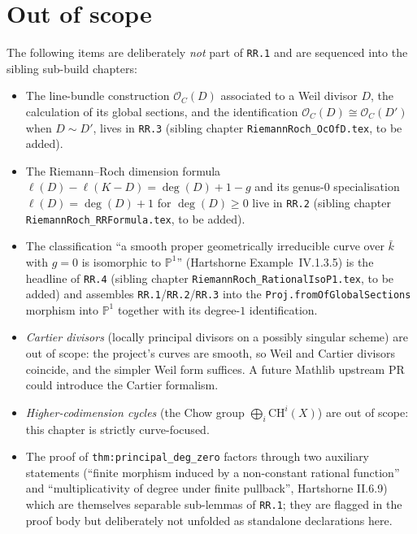 \section{Out of scope}
The following items are deliberately \emph{not} part of \texttt{RR.1} and
are sequenced into the sibling sub-build chapters:
\begin{itemize}
  \item The line-bundle construction \(\mathcal O_C(D)\) associated to a Weil
    divisor \(D\), the calculation of its global sections, and the
    identification \(\mathcal O_C(D) \cong \mathcal O_C(D')\) when
    \(D \sim D'\), lives in \texttt{RR.3} (sibling chapter
    \texttt{RiemannRoch\_OcOfD.tex}, to be added).
  \item The Riemann--Roch dimension formula
    \(\ell(D) - \ell(K - D) = \deg(D) + 1 - g\) and its genus-\(0\) specialisation
    \(\ell(D) = \deg(D) + 1\) for \(\deg(D) \geq 0\) live in \texttt{RR.2}
    (sibling chapter \texttt{RiemannRoch\_RRFormula.tex}, to be added).
  \item The classification ``a smooth proper geometrically irreducible
    curve over \(\bar k\) with \(g = 0\) is isomorphic to \(\mathbb P^1\)''
    (Hartshorne Example~IV.1.3.5) is the headline of \texttt{RR.4}
    (sibling chapter \texttt{RiemannRoch\_RationalIsoP1.tex}, to be added)
    and assembles \texttt{RR.1}/\texttt{RR.2}/\texttt{RR.3} into the
    \texttt{Proj.fromOfGlobalSections} morphism into \(\mathbb P^1\) together
    with its degree-\(1\) identification.
  \item \emph{Cartier divisors} (locally principal divisors on a possibly
    singular scheme) are out of scope: the project's curves are smooth, so
    Weil and Cartier divisors coincide, and the simpler Weil form suffices.
    A future Mathlib upstream PR could introduce the Cartier formalism.
  \item \emph{Higher-codimension cycles} (the Chow group
    \(\bigoplus_i \mathrm{CH}^i(X)\)) are out of scope: this chapter is
    strictly curve-focused.
  \item The proof of \texttt{thm:principal_deg_zero} factors through two
    auxiliary statements (``finite morphism induced by a non-constant
    rational function'' and ``multiplicativity of degree under finite
    pullback'', Hartshorne II.6.9) which are themselves separable
    sub-lemmas of \texttt{RR.1}; they are flagged in the proof body but
    deliberately not unfolded as standalone declarations here.
\end{itemize}

